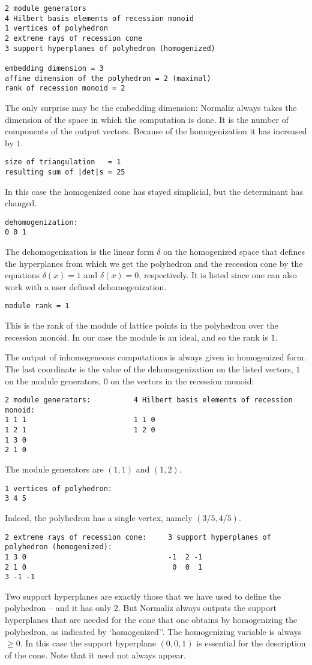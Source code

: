\documentclass[12pt,a4paper]{scrartcl}
\theoremstyle{definition}
\begin{document}
\begin{Verbatim}
2 module generators
4 Hilbert basis elements of recession monoid
1 vertices of polyhedron
2 extreme rays of recession cone
3 support hyperplanes of polyhedron (homogenized)

embedding dimension = 3
affine dimension of the polyhedron = 2 (maximal)
rank of recession monoid = 2
\end{Verbatim}
The only surprise may be the embedding dimension: Normaliz always takes the dimension of the space in which the computation is done. It is the number of components of the output vectors. Because of the homogenization it has increased by $1$.
\begin{Verbatim}
size of triangulation   = 1
resulting sum of |det|s = 25
\end{Verbatim}
In this case the homogenized cone has stayed simplicial, but the determinant has changed.
\begin{Verbatim}
dehomogenization:
0 0 1 
\end{Verbatim}
The dehomogenization is the linear form $\delta$ on the homogenized space that defines the hyperplanes from which we get the polyhedron and the recession cone by the equations $\delta(x)=1$ and $\delta(x)=0$, respectively. It is listed since one can also work with a user defined dehomogenization.
\begin{Verbatim}
module rank = 1
\end{Verbatim}
This is the rank of the module of lattice points in the polyhedron over the recession monoid. In our case the module is an ideal, and so the rank is $1$.

The output of inhomogeneous computations is always given in homogenized form. The last coordinate is the value of the dehomogenization on the listed vectors, $1$ on the module generators, $0$ on the vectors in the recession monoid:
\begin{Verbatim}
2 module generators:          4 Hilbert basis elements of recession monoid:
1 1 1                         1 1 0
1 2 1                         1 2 0
1 3 0
2 1 0
\end{Verbatim}
The module generators are $(1,1)$ and $(1,2)$.
\begin{Verbatim}
1 vertices of polyhedron:
3 4 5
\end{Verbatim}
Indeed, the polyhedron has a single vertex, namely $(3/5,4/5)$.
\begin{Verbatim}
2 extreme rays of recession cone:     3 support hyperplanes of polyhedron (homogenized):
1 3 0                                 -1  2 -1
2 1 0                                  0  0  1                                
3 -1 -1
\end{Verbatim}
Two support hyperplanes are exactly those that we have used to define the polyhedron -- and it has only $2$. But Normaliz always outputs the support hyperplanes that are needed for the cone that one obtains by homogenizing the polyhedron, as indicated by `homogenized''. The homogenizing variable is always $\ge 0$. In this case the support hyperplane $(0,0,1)$ is essential for the description of the cone. Note that it need not always appear.
\end{document}
